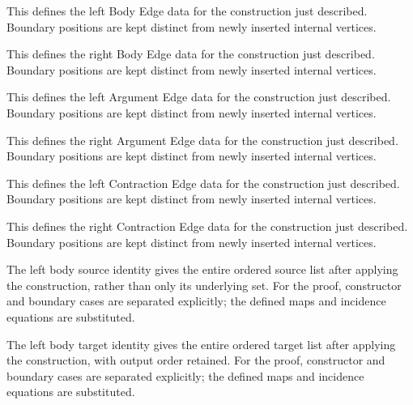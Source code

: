 This defines the left Body Edge data for the construction just described. Boundary positions are kept distinct from newly inserted internal vertices.
\par{}

This defines the right Body Edge data for the construction just described. Boundary positions are kept distinct from newly inserted internal vertices.
\par{}

This defines the left Argument Edge data for the construction just described. Boundary positions are kept distinct from newly inserted internal vertices.
\par{}

This defines the right Argument Edge data for the construction just described. Boundary positions are kept distinct from newly inserted internal vertices.
\par{}

This defines the left Contraction Edge data for the construction just described. Boundary positions are kept distinct from newly inserted internal vertices.
\par{}

This defines the right Contraction Edge data for the construction just described. Boundary positions are kept distinct from newly inserted internal vertices.
\par{}

The left body source identity gives the entire ordered source list after applying the construction, rather than only its underlying set.
For the proof, constructor and boundary cases are separated explicitly; the defined maps and incidence equations are substituted.
\par{}

The left body target identity gives the entire ordered target list after applying the construction, with output order retained.
For the proof, constructor and boundary cases are separated explicitly; the defined maps and incidence equations are substituted.
\par{}

